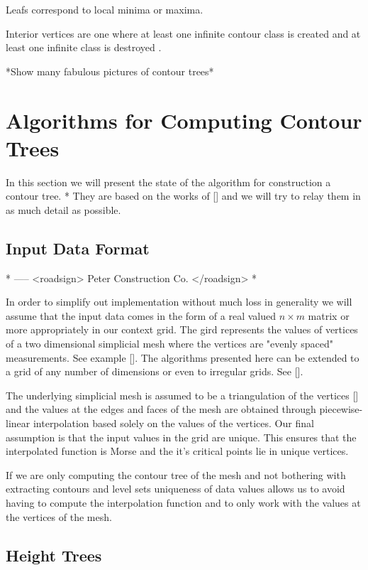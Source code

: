 Leafs correspond to local minima or maxima.

Interior vertices are one where at least one infinite contour class is created and at least one infinite class is destroyed \cite{hamish-masters}.

*Show many fabulous pictures of contour trees*


\section{Algorithms for Computing Contour Trees}

In this section we will present the state of the algorithm for construction a contour tree. * They are based on the works of [] and we will try to relay them in as much detail as possible.

\subsection{Input Data Format}

* ----- <roadsign> Peter Construction Co. </roadsign> *

In order to simplify out implementation without much loss in generality we will assume that the input data comes in the form of a real valued $n \times m$ matrix or more appropriately in our context grid. The gird represents the values of vertices of a two dimensional simplicial mesh where the vertices are "evenly spaced" measurements. See example []. The algorithms presented here can be extended to a grid of any number of dimensions or even to irregular grids. See []. 

The underlying simplicial mesh is assumed to be a triangulation of the vertices [] and the values at the edges and faces of the mesh are obtained through piecewise-linear interpolation based solely on the values of the vertices. Our final assumption is that the input values in the grid are unique. This ensures that the interpolated function is Morse and the it's critical points lie in unique vertices.

If we are only computing the contour tree of the mesh and not bothering with extracting contours and level sets uniqueness of data values allows us to avoid having to compute the interpolation function and to only work with the values at the vertices of the mesh.

\subsection{Height Trees}

